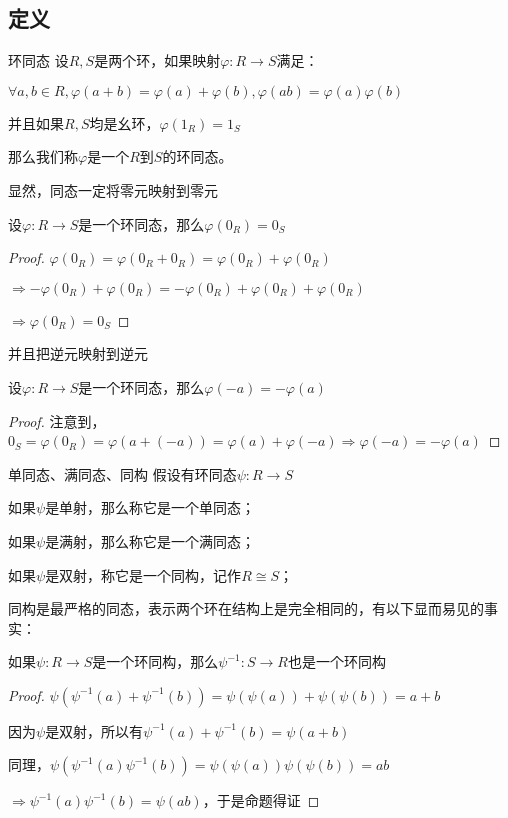 \documentclass[12pt, a4paper, oneside, UTF8]{ctexbook}
\begin{document}
		\subsection{定义}
			\begin{defn}{环同态}{}
				设$R,S$是两个环，如果映射$\varphi : R \rightarrow S$满足：

				$\forall a,b \in R,\varphi (a+b)=\varphi (a)+\varphi (b),\varphi (ab)=\varphi (a)\varphi (b)$

				并且如果$R,S$均是幺环，$\varphi (1_R)=1_S$
				
				那么我们称$\varphi $是一个$R$到$S$的环同态。
			\end{defn}
			显然，同态一定将零元映射到零元
			\begin{proposition}
				设$\varphi : R \rightarrow S$是一个环同态，那么$\varphi (0_R) = 0_S$
			\end{proposition}
			\begin{proof}
				$\varphi (0_R) = \varphi (0_R + 0_R) = \varphi (0_R) + \varphi (0_R)$

				$\Rightarrow -\varphi (0_R)+\varphi (0_R) = -\varphi (0_R)+\varphi (0_R)+\varphi (0_R)$

				$\Rightarrow \varphi (0_R)=0_S$
			\end{proof}
			并且把逆元映射到逆元
			\begin{proposition}
				设$\varphi : R \rightarrow S$是一个环同态，那么$\varphi (-a) = -\varphi (a)$
			\end{proposition}
			\begin{proof}
				注意到，$0_S = \varphi (0_R) = \varphi (a + (-a)) = \varphi (a) + \varphi (-a) \Rightarrow \varphi (-a)=-\varphi (a)$
			\end{proof}
			\begin{defn}{单同态、满同态、同构}{}
				假设有环同态$\psi :R \rightarrow S$

				如果$\psi $是单射，那么称它是一个单同态；

				如果$\psi $是满射，那么称它是一个满同态；

				如果$\psi $是双射，称它是一个同构，记作$R \cong S$；
			\end{defn}
			同构是最严格的同态，表示两个环在结构上是完全相同的，有以下显而易见的事实：
			\begin{proposition}
				如果$\psi : R \rightarrow S$是一个环同构，那么$\psi^{-1} : S \rightarrow R$也是一个环同构
			\end{proposition}
			\begin{proof}
				$\psi \left(\psi^{-1} (a)+\psi^{-1} (b)\right)=\psi \left(\psi (a)\right)+\psi \left(\psi (b)\right)=a+b$

				因为$\psi $是双射，所以有$\psi^{-1} (a)+\psi^{-1} (b)=\psi (a+b)$

				同理，$\psi \left(\psi^{-1} (a)\psi^{-1} (b)\right)=\psi \left(\psi (a)\right)\psi \left(\psi (b)\right)=ab$

				$\Rightarrow \psi^{-1} (a)\psi^{-1} (b)=\psi (ab)$，于是命题得证
			\end{proof}
\end{document}
